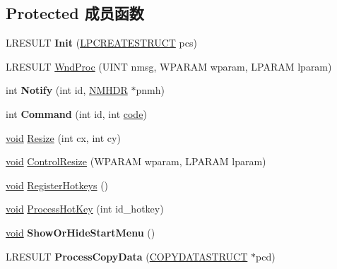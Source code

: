 \subsection*{Protected 成员函数}
\begin{DoxyCompactItemize}
\item 
\mbox{\label{struct_desktop_bar_a2b351f7fc1b444f16a16bb17faae94d1}} 
L\+R\+E\+S\+U\+LT {\bfseries Init} (\hyperlink{structtag_c_r_e_a_t_e_s_t_r_u_c_t_a}{L\+P\+C\+R\+E\+A\+T\+E\+S\+T\+R\+U\+CT} pcs)
\item 
L\+R\+E\+S\+U\+LT \hyperlink{struct_desktop_bar_ada798df262ee57ae2d3e9f8a3ee38d0d}{Wnd\+Proc} (U\+I\+NT nmsg, W\+P\+A\+R\+AM wparam, L\+P\+A\+R\+AM lparam)
\item 
\mbox{\label{struct_desktop_bar_a1458cb65d00ebea4a98f37c5b647368a}} 
int {\bfseries Notify} (int id, \hyperlink{structtag_n_m_h_d_r}{N\+M\+H\+DR} $\ast$pnmh)
\item 
\mbox{\label{struct_desktop_bar_a81eeafe16eae3fe827bb964e47da9554}} 
int {\bfseries Command} (int id, int \hyperlink{structcode}{code})
\item 
\hyperlink{interfacevoid}{void} \hyperlink{struct_desktop_bar_a09a6f166765537c7f7bcc41220ea3d58}{Resize} (int cx, int cy)
\item 
\hyperlink{interfacevoid}{void} \hyperlink{struct_desktop_bar_a47e1906c84e318b43d8e33bf141a4ea6}{Control\+Resize} (W\+P\+A\+R\+AM wparam, L\+P\+A\+R\+AM lparam)
\item 
\hyperlink{interfacevoid}{void} \hyperlink{struct_desktop_bar_a3a29770a6acbd3e0b6e0cb286d462b58}{Register\+Hotkeys} ()
\item 
\hyperlink{interfacevoid}{void} \hyperlink{struct_desktop_bar_ad78702ec191b91c67e845ea72978e241}{Process\+Hot\+Key} (int id\+\_\+hotkey)
\item 
\mbox{\label{struct_desktop_bar_a26e9bb3ce32a9f7f267c6b9cc904dae8}} 
\hyperlink{interfacevoid}{void} {\bfseries Show\+Or\+Hide\+Start\+Menu} ()
\item 
\mbox{\label{struct_desktop_bar_af35dd6a55dfb3804deb6220b70bd079f}} 
L\+R\+E\+S\+U\+LT {\bfseries Process\+Copy\+Data} (\hyperlink{structtag_c_o_p_y_d_a_t_a_s_t_r_u_c_t}{C\+O\+P\+Y\+D\+A\+T\+A\+S\+T\+R\+U\+CT} $\ast$pcd)
\end{DoxyCompactItemize}
